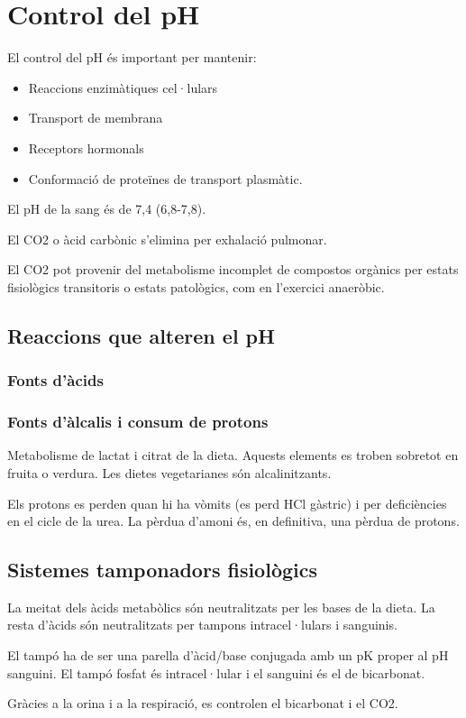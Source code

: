 
\section{Control del pH}
\label{sec:control-del-ph}

El control del pH és important per mantenir:
\begin{itemize}
\item Reaccions enzimàtiques cel·lulars
\item Transport de membrana
\item Receptors hormonals
\item Conformació de proteïnes de transport plasmàtic.
\end{itemize}

El pH de la sang és de 7,4 (6,8-7,8).

El CO2 o àcid carbònic s'elimina per exhalació pulmonar.

El CO2 pot provenir del metabolisme incomplet de compostos orgànics per estats fisiològics transitoris o estats patològics, com en l'exercici anaeròbic.

\subsection{Reaccions que alteren el pH}
\label{sec:reacc-que-alter}

\subsubsection{Fonts d'àcids}
\label{sec:fonts-dacids}


\subsubsection{Fonts d'àlcalis i consum de protons}
\label{sec:fonts-dalcalis}
Metabolisme de lactat i citrat de la dieta. Aquests elements es troben sobretot en fruita o verdura. Les dietes vegetarianes són alcalinitzants.

Els protons es perden quan hi ha vòmits (es perd HCl gàstric) i per deficiències en el cicle de la urea. La pèrdua d'amoni és, en definitiva, una pèrdua de protons.

\subsection{Sistemes tamponadors fisiològics}
\label{sec:sist-tamp-fisi}

La meitat dels àcids metabòlics són neutralitzats per les bases de la dieta. La resta d'àcids són neutralitzats per tampons intracel·lulars i sanguinis.


El tampó ha de ser una parella d'àcid/base conjugada amb un pK proper al pH sanguini. El tampó fosfat és intracel·lular i el sanguini és el de bicarbonat.

Gràcies a la orina i a la respiració, es controlen el bicarbonat i el CO2.